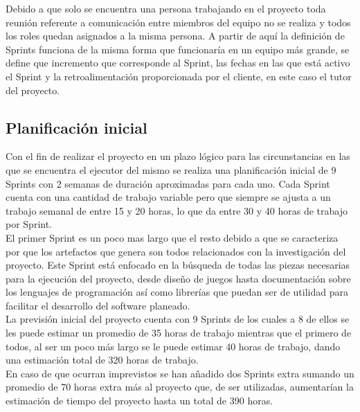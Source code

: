 Debido a que solo se encuentra una persona trabajando en el proyecto toda reunión referente a comunicación entre miembros del equipo no se realiza y todos los roles quedan asignados a la misma persona. A partir de aquí la definición de Sprints funciona de la misma forma que funcionaría en un equipo más grande, se define que incremento que corresponde al Sprint, las fechas en las que está activo el Sprint y la retroalimentación proporcionada por el cliente, en este caso el tutor del proyecto.

\subsection{Planificación inicial}
Con el fin de realizar el proyecto en un plazo lógico para las circunstancias en las que se encuentra el ejecutor del mismo se realiza una planificación inicial de 9 Sprints con 2 semanas de duración aproximadas para cada uno. Cada Sprint cuenta con una cantidad de trabajo variable pero que siempre se ajusta a un trabajo semanal de entre 15 y 20 horas, lo que da entre 30 y 40 horas de trabajo por Sprint.
\\

El primer Sprint es un poco mas largo que el resto debido a que se caracteriza por que los artefactos que genera son todos relacionados con la investigación del proyecto. Este Sprint está enfocado en la búsqueda de todas las piezas necesarias para la ejecución del proyecto, desde diseño de juegos hasta documentación sobre los lenguajes de programación así como librerías que puedan ser de utilidad para facilitar el desarrollo del software planeado.
\\

La previsión inicial del proyecto cuenta con 9 Sprints de los cuales a 8 de ellos se les puede estimar un promedio de 35 horas de trabajo mientras que el primero de todos, al ser un poco más largo se le puede estimar 40 horas de trabajo, dando una estimación total de 320 horas de trabajo.
\\

En caso de que ocurran imprevistos se han añadido dos Sprints extra sumando un promedio de 70 horas extra más al proyecto que, de ser utilizadas, aumentarían la estimación de tiempo del proyecto hasta un total de 390 horas.
\\

